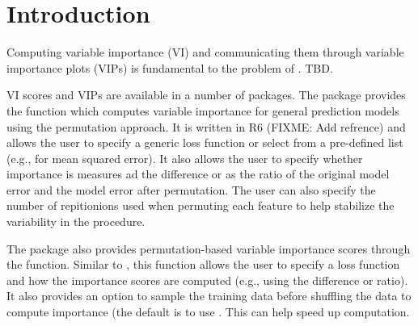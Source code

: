 \section{Introduction}

Computing variable importance (VI) and communicating them through variable importance plots (VIPs) is fundamental to the problem of . TBD.

VI scores and VIPs are available in a number of packages. The  package \citep{iml-pkg} provides the  function which computes variable importance for general prediction models using the permutation approach. It is written in R6 (FIXME: Add refrence) and allows the user to specify a generic loss function or select from a pre-defined list (e.g.,  for mean squared error). It also allows the user to specify whether importance is measures ad the difference or as the ratio of the original model error and the model error after permutation. The user can also specify the number of repitionions used when permuting each feature to help stabilize the variability in the procedure.

The  package \citep{DALEX-pkg} also provides permutation-based variable importance scores through the  function. Similar to , this function allows the user to specify a loss function and how the importance scores are computed (e.g., using the difference or ratio). It also provides an option to sample the training data before shuffling the data to compute importance (the default is to use . This can help speed up computation.


